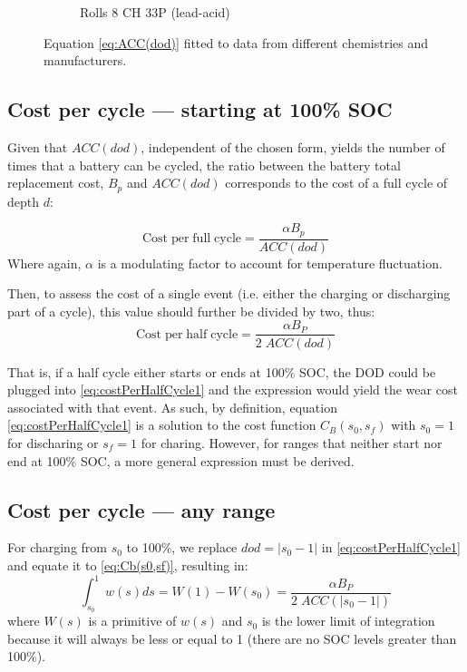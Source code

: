 \documentclass{ieeeaccess}
\begin{document}
\begin{figure}[!h]
\begin{subfigure}{.235\textwidth}
    		\caption{Rolls 8 CH 33P (lead-acid)}
    		\label{fig:accNimh}
    	\end{subfigure}
    	\caption{Equation \eqref{eq:ACC(dod)} fitted to data from different chemistries and manufacturers.}
    	\label{fig:acc(dod)}
    \end{figure}

    \subsection{Cost per cycle --- starting at 100\% SOC}
    Given that $ACC(dod)$, independent of the chosen form, yields the number of times that a battery can be cycled, the ratio between the battery total replacement cost, $B_p$ and $ACC(dod)$ corresponds to the cost of a full cycle of depth $d$:

    $$ \mathrm{Cost \; per \; full \; cycle} = \frac{ \alpha B_p}{ACC(dod)} $$
    Where again, $\alpha$ is a modulating factor to account for temperature fluctuation.

    Then, to assess the cost of a single event (i.e. either the charging or discharging part of a cycle), this value should further be divided by two, thus:
    \begin{equation}
        \mathrm{Cost \; per \; half \; cycle} = \frac{ \alpha B_{P}}{2 \; ACC(dod)}
        \label{eq:costPerHalfCycle1}
    \end{equation}

    That is, if a half cycle either starts or ends at 100\% \ac{SOC}, the \ac{DOD} could be plugged into \eqref{eq:costPerHalfCycle1} and the expression would yield the wear cost associated with that event. As such, by definition, equation \eqref{eq:costPerHalfCycle1} is a solution to the cost function $C_B(s_{0}, s_{f})$ with $s_0 = 1$ for discharing or $s_f = 1$ for charing. However, for ranges that neither start nor end at 100\% \ac{SOC}, a more general expression must be derived.

    \subsection{Cost per cycle --- any range}

    For charging from $s_0$ to 100\%, we replace $dod=|s_{0}-1|$ in \eqref{eq:costPerHalfCycle1} and equate it to \eqref{eq:Cb(s0,sf)}, resulting in:
    \small
       $$ \int_{s_{0}}^{1}w(s)ds = W(1) - W(s_{0}) = \frac{\alpha B_{P}}{2 \; ACC(|s_{0}-1|)} $$
	\normalsize
    where $W(s)$ is a primitive of $w(s)$ and $s_{0}$ is the lower limit of integration because it will always be less or equal to 1 (there are no \ac{SOC} levels greater than 100\%).
\end{document}
